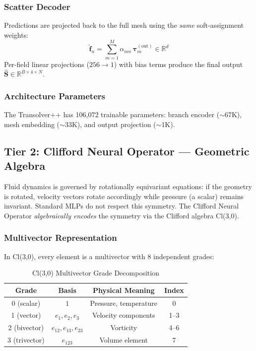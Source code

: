 \documentclass[conference]{IEEEtran}
\begin{document}
\subsubsection{Scatter Decoder}
Predictions are projected back to the full mesh using the \emph{same} soft-assignment weights:
\begin{equation}
\hat{\bm{f}}_n = \sum_{m=1}^{M} \alpha_{nm}\,\bm{\tau}_m^{(\text{out})} \in \mathbb{R}^{d}
\label{eq:scatter}
\end{equation}
Per-field linear projections ($256 \to 1$) with bias terms produce the final output $\hat{\bm{S}} \in \mathbb{R}^{B \times 4 \times N}$.

\subsubsection{Architecture Parameters}
The Transolver++ has 106,072 trainable parameters: branch encoder ($\sim$67K), mesh embedding ($\sim$33K), and output projection ($\sim$1K).

\subsection{Tier 2: Clifford Neural Operator --- Geometric Algebra}
\label{sec:clifford}

Fluid dynamics is governed by rotationally equivariant equations: if the geometry is rotated, velocity vectors rotate accordingly while pressure (a scalar) remains invariant. Standard MLPs do not respect this symmetry. The Clifford Neural Operator \cite{brandstetter2023clifford} \emph{algebraically encodes} the symmetry via the Clifford algebra Cl(3,0).

\subsubsection{Multivector Representation}
In Cl(3,0), every element is a multivector with 8 independent grades:

\begin{table}[htbp]
\caption{Cl(3,0) Multivector Grade Decomposition}
\label{tab:grades}
\centering
\begin{tabular}{cccc}
\toprule
\textbf{Grade} & \textbf{Basis} & \textbf{Physical Meaning} & \textbf{Index} \\
\midrule
0 (scalar) & $1$ & Pressure, temperature & 0 \\
1 (vector) & $e_1, e_2, e_3$ & Velocity components & 1--3 \\
2 (bivector) & $e_{12}, e_{13}, e_{23}$ & Vorticity & 4--6 \\
3 (trivector) & $e_{123}$ & Volume element & 7 \\
\bottomrule
\end{tabular}
\end{table}
\end{document}
